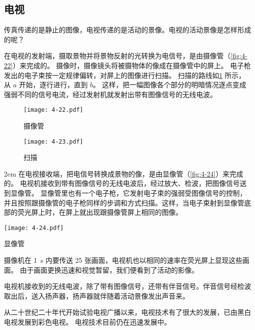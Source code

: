 \subsection{电视}
传真传递的是静止的图像，电视传递的是活动的景像。电视的活动景像是怎样形成的呢？

在电视的发射端，摄取景物并将景物反射的光转换为电信号，是由摄像管（\cref{fig:4-22}）来完成的。
摄像时，摄像镜头将被摄物体的像成在摄像管中的屏上。
电子枪发出的电子束按一定规律偏转，对屏上的图像进行扫描。
扫描的路线如\cref{fig:4-23} 所示，从 $a$ 开始，逐行进行，直到 $b$。
这样，把一幅图像各个部分的明暗情况逐点变成强弱不同的信号电流，经过发射机就发射出带有图像信号的无线电波。
\begin{figure}
	\begin{minipage}[b]{0.58\linewidth}\centering
		\texttt{[image: 4-22.pdf]}
	\caption{摄像管}\label{fig:4-22}
	\end{minipage}
	\begin{minipage}[b]{0.38\linewidth}\centering
		\texttt{[image: 4-23.pdf]}
		\caption{扫描}\label{fig:4-23}
	\end{minipage}
\end{figure}

\medskip\noindent
\begin{minipage}{0.51\linewidth}\parindent2em
在电视接收端，把电信号转换成景物的像，是由显像管（\cref{fig:4-24}）来完成的。
电视机接收到带有图像信号的无线电波后，经过放大、检波，把图像信号送到显像管。
显像管里也有一个电子枪，它发射电子束的强弱受图像信号的控制，并且按照跟摄像管的电子枪同样的步调和方式扫描。这样，当电子束射到显像管底部的荧光屏上时，在屏上就出现跟摄像管屏上相同的图像。
\end{minipage}\hfill
\begin{minipage}{0.48\linewidth}\centering
	\begin{figurehere}
		\texttt{[image: 4-24.pdf]}
		\caption{显像管}\label{fig:4-24}
	\end{figurehere}
\end{minipage}

\medskip
摄像机在 \qty{1}{s} 内要传送 25 张画面，电视机也以相同的速率在荧光屏上显现这些画面。
由于画面更换迅速和视觉暂留，我们便看到了活动的影像。

电视机接收到的无线电波，除了带有图像信号，还带有伴音信号。伴音信号经检波取出后，送入扬声器，扬声器就伴随着活动景像发出声音来。

从二十世纪二十年代开始试验电视广播以来，电视技术有了很大的发展，已由黑白电视发展到彩色电视。
电视技术目前仍在迅速发展中。

